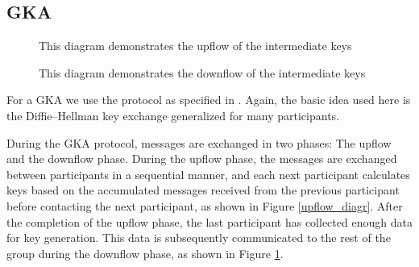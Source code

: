 \subsection{GKA}
\label{gka_subprot}

\begin{figure}
  \begin{minipage}{0.49\textwidth}
    \caption{This diagram demonstrates the upflow of the intermediate keys}
    \label{upflow_diagr}
  \end{minipage}
  \begin{minipage}{0.49\textwidth}
    \caption{This diagram demonstrates the downflow of the intermediate keys}
    \label{downflow_diagr}
  \end{minipage}
\end{figure}

For a GKA we use the protocol as specified in \cite{mpenc}.
Again, the basic idea used here is the Diffie--Hellman key exchange generalized for many participants.

During the GKA protocol, messages are exchanged in two phases: The upflow and the downflow phase.
During the upflow phase, the messages are exchanged between participants in a sequential manner, and each next participant calculates keys based on the accumulated messages received from the previous participant before contacting the next participant, as shown in Figure \ref{upflow_diagr}.
After the completion of the upflow phase, the last participant has collected enough data for key generation.
This data is subsequently communicated to the rest of the group during the downflow phase, as shown in Figure \ref{downflow_diagr}.

